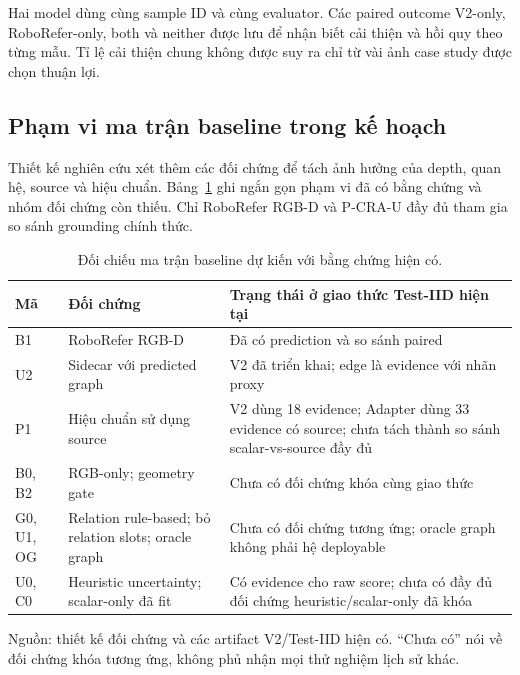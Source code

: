 {\setlength{\emergencystretch}{3em}
Hai model dùng cùng sample ID và cùng evaluator.
Các paired outcome V2-only, RoboRefer-only, both và neither
được lưu để nhận biết cải thiện và hồi quy theo từng mẫu.
Tỉ lệ cải thiện chung không được suy ra chỉ từ vài ảnh
case study được chọn thuận lợi.\par}


\subsection{Phạm vi ma trận baseline trong kế hoạch}

Thiết kế nghiên cứu xét thêm các đối chứng để tách ảnh hưởng của depth,
quan hệ, source và hiệu chuẩn. Bảng~\ref{tab:setup-baseline-status} ghi
ngắn gọn phạm vi đã có bằng chứng và nhóm đối chứng còn thiếu. Chỉ
RoboRefer RGB-D và P-CRA-U đầy đủ tham gia so sánh grounding chính thức.

\begin{table}[htbp]
    \centering
    \setlength{\tabcolsep}{4pt}
    \renewcommand{\arraystretch}{1.15}
    \caption{Đối chiếu ma trận baseline dự kiến với bằng chứng hiện có.}
    \label{tab:setup-baseline-status}
    \small
    \begin{tabularx}{\textwidth}{@{}l>{\raggedright\arraybackslash}p{}>{\raggedright\arraybackslash}X@{}}
        \toprule
        Mã & Đối chứng & Trạng thái ở giao thức Test-IID hiện tại \\
        \midrule
        B1 & RoboRefer RGB-D & Đã có prediction và so sánh paired \\
        U2 & Sidecar với predicted graph &
        V2 đã triển khai; edge là evidence với nhãn proxy \\
        P1 & Hiệu chuẩn sử dụng source &
        V2 dùng 18 evidence; Adapter dùng 33 evidence có source;
        chưa tách thành so sánh scalar-vs-source đầy đủ \\
        B0, B2 & RGB-only; geometry gate &
        Chưa có đối chứng khóa cùng giao thức \\
        G0, U1, OG & Relation rule-based; bỏ relation slots;
        oracle graph & Chưa có đối chứng tương ứng;
        oracle graph không phải hệ deployable \\
        U0, C0 & Heuristic uncertainty; scalar-only đã fit &
        Có evidence cho raw score; chưa có đầy đủ đối chứng
        heuristic/scalar-only đã khóa \\
        \bottomrule
    \end{tabularx}
    \vspace{2pt}
    {\footnotesize\raggedright Nguồn: thiết kế đối chứng và các artifact
    V2/Test-IID hiện có. “Chưa có” nói về đối chứng khóa
    tương ứng, không phủ nhận mọi thử nghiệm lịch sử khác.\par}
\end{table}

